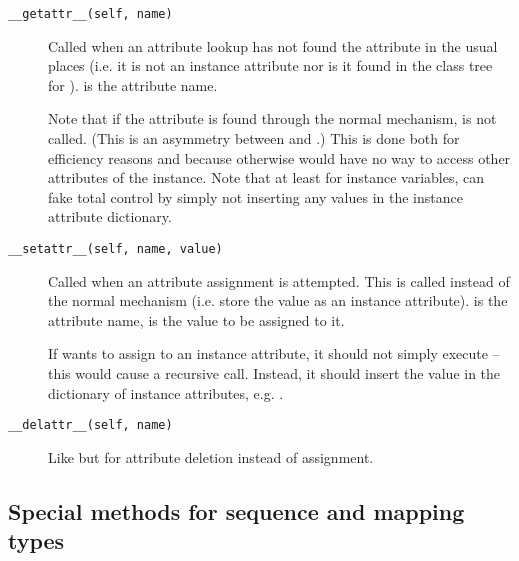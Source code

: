 \begin{description}

\item[\tt __getattr__(self, name)]
Called when an attribute lookup has not found the attribute in the
usual places (i.e. it is not an instance attribute nor is it found in
the class tree for ).   is the attribute name.

Note that if the attribute is found through the normal mechanism,
 is not called.  (This is an asymmetry between
 and .)
This is done both for efficiency reasons and because otherwise
 would have no way to access other attributes of the
instance.
Note that at least for instance variables,  can fake
total control by simply not inserting any values in the instance
attribute dictionary.

\item[\tt __setattr__(self, name, value)]
Called when an attribute assignment is attempted.  This is called
instead of the normal mechanism (i.e. store the value as an instance
attribute).   is the attribute name,  is the
value to be assigned to it.

If  wants to assign to an instance attribute, it
should not simply execute  -- this would
cause a recursive call.  Instead, it should insert the value in the
dictionary of instance attributes, e.g. .

\item[\tt __delattr__(self, name)]
Like  but for attribute deletion instead of
assignment.

\end{description}


\subsection{Special methods for sequence and mapping types}

